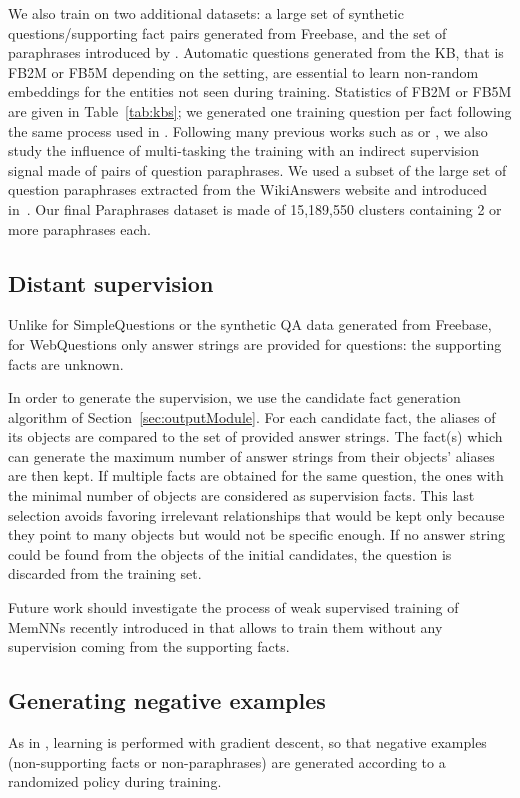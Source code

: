 \documentclass[11pt,a4paper]{article}
\newcommand{\fb}{{\sf Freebase}\xspace}
\newcommand{\wq}{{\sf WebQuestions}\xspace}
\newcommand{\fbq}{{\sf SimpleQuestions}\xspace}
\newcommand{\fbs}{{\sf FB2M}\xspace}
\newcommand{\fbb}{{\sf FB5M}\xspace}
\newcommand{\prp}{{\sf Paraphrases}\xspace}
\newcommand{\wk}{{\sc WikiAnswers}\xspace}
\begin{document}
We also train on two additional datasets: a large set of synthetic
questions/supporting fact pairs generated from \fb, and the set of
paraphrases introduced by \cite{fader2014open}.
Automatic questions generated from the KB, that is \fbs or \fbb
depending on the setting, are essential to learn non-random embeddings for the
entities not seen during training.
Statistics of \fbs or \fbb are given in Table~\ref{tab:kbs}; we
generated one training question per fact following the same process
used in \cite{bordes-chopra-weston:2014:EMNLP2014}.
Following many previous works such as \cite{paralex} or
\cite{bordes2014open}, we also study the influence of multi-tasking
the training with an
indirect supervision signal made of pairs of question paraphrases.
We used a subset of the large set of question paraphrases extracted
from the \wk website and introduced in~\cite{fader2014open}.
Our final \prp dataset is made of 15,189,550 clusters containing 2 or more
paraphrases each.
\fi

\subsection{Distant supervision}
Unlike for \fbq or the synthetic QA data generated from \fb,  for
\wq only answer strings are provided for questions: the
supporting facts are unknown.

In order to generate the supervision, we use the candidate fact
generation algorithm of Section~\ref{sec:outputModule}. For each
candidate fact, the aliases of its objects are compared to the set of
provided answer strings. The fact(s) which can generate the maximum
number of answer strings from their objects' aliases are then kept. If
multiple facts are obtained for the same question, the ones with
the minimal number of objects are considered as supervision facts. This
last selection avoids favoring  irrelevant relationships that would be
kept only because they point to many objects but would not be specific
enough. If no answer string could be found from the objects of the
initial candidates, the question is discarded from the training set.

Future work should investigate the process of weak supervised training
of MemNNs recently introduced in \cite{sukhbaatar2015weakly} that
allows to train them without any supervision coming from the
supporting facts.

\subsection{Generating negative examples}
As in \cite{bordes-chopra-weston:2014:EMNLP2014,bordes2014open},
learning is performed with gradient descent, so that negative examples
(non-supporting facts or non-paraphrases) are generated according to a
randomized policy during training.
\end{document}
